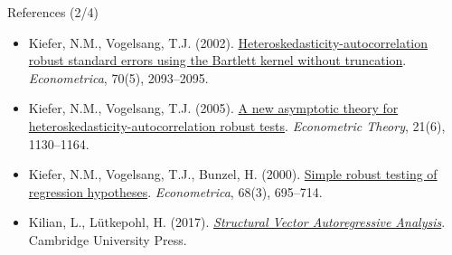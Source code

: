 \begin{frame}{References (2/4)}
\begin{itemize}
    \item Kiefer, N.M., Vogelsang, T.J. (2002). \href{https://doi.org/10.1111/1468-0262.00366}{Heteroskedasticity-autocorrelation robust standard errors using the Bartlett kernel without truncation}. \emph{Econometrica}, 70(5), 2093--2095.
    \item Kiefer, N.M., Vogelsang, T.J. (2005). \href{https://doi.org/10.1017/S0266466605050565}{A new asymptotic theory for heteroskedasticity-autocorrelation robust tests}. \emph{Econometric Theory}, 21(6), 1130--1164.
    \item Kiefer, N.M., Vogelsang, T.J., Bunzel, H. (2000). \href{https://doi.org/10.1111/1468-0262.00128}{Simple robust testing of regression hypotheses}. \emph{Econometrica}, 68(3), 695--714.
    \item Kilian, L., Lütkepohl, H. (2017). \href{https://doi.org/10.1017/9781108164818}{\emph{Structural Vector Autoregressive Analysis}}. Cambridge University Press.
\end{itemize}
\end{frame}

